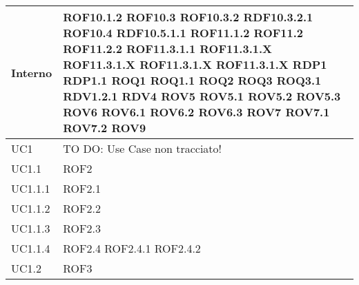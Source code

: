 \begin{center}
\begin{longtable}{| p{4cm} | p{4cm} |}
\hline
Interno & ROF10.1.2 \newline ROF10.3 \newline ROF10.3.2 \newline RDF10.3.2.1 \newline ROF10.4 \newline RDF10.5.1.1 \newline ROF11.1.2 \newline ROF11.2 \newline ROF11.2.2 \newline ROF11.3.1.1 \newline ROF11.3.1.X \newline ROF11.3.1.X \newline ROF11.3.1.X \newline ROF11.3.1.X \newline RDP1 \newline RDP1.1 \newline ROQ1 \newline ROQ1.1 \newline ROQ2 \newline ROQ3 \newline ROQ3.1 \newline RDV1.2.1 \newline RDV4 \newline ROV5 \newline ROV5.1 \newline ROV5.2 \newline ROV5.3 \newline ROV6 \newline ROV6.1 \newline ROV6.2 \newline ROV6.3 \newline ROV7 \newline ROV7.1 \newline ROV7.2 \newline ROV9 \newline \\
\hline
UC1 & TO DO: Use Case non tracciato! \\
\hline
UC1.1 & ROF2 \\
\hline
UC1.1.1 & ROF2.1 \\
\hline
UC1.1.2 & ROF2.2 \\
\hline
UC1.1.3 & ROF2.3 \\
\hline
UC1.1.4 & ROF2.4 \newline ROF2.4.1 \newline ROF2.4.2 \\
\hline
UC1.2 & ROF3 \\

\end{longtable}
\end{center}
